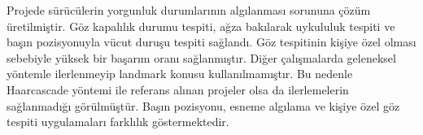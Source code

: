 \documentclass[12pt, a4paper]{article}
\begin{document}
	Projede sürücülerin yorgunluk durumlarının algılanması sorununa çözüm üretilmiştir. Göz kapalılık durumu tespiti, ağza bakılarak uykululuk tespiti ve başın pozisyonuyla vücut duruşu tespiti sağlandı. Göz tespitinin kişiye özel olması sebebiyle yüksek bir başarım oranı sağlanmıştır. Diğer çalışmalarda geleneksel yöntemle ilerlenmeyip landmark konusu kullanılmamıştır. Bu nedenle Haarcascade yöntemi ile referans alınan projeler olsa da ilerlemelerin sağlanmadığı görülmüştür. Başın pozisyonu, esneme algılama ve kişiye özel göz tespiti uygulamaları farklılık göstermektedir.

\newpage 	
	
\end{document}
